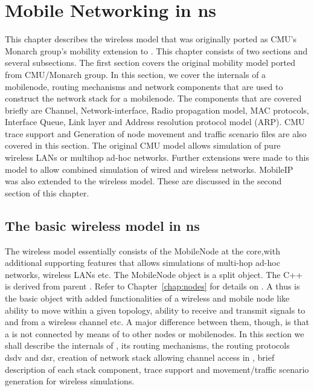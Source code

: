 %
\chapter{Mobile Networking in ns}
\label{chap:mobility}

This chapter describes the wireless model that was originally ported as CMU's Monarch group's mobility extension to \ns. 
This chapter consists of two sections and several subsections. The first section covers the original mobility model ported from CMU/Monarch group. In this section, we cover the internals of a mobilenode, routing mechanisms and network components that are used to construct the network stack for a mobilenode. The components that are covered briefly are Channel, Network-interface, Radio propagation model, MAC protocols, Interface Queue, Link layer and Address resolution protocol model (ARP). CMU trace support and Generation of node movement and traffic scenario files are also covered in this section.
The original CMU model allows simulation of pure wireless LANs or multihop ad-hoc networks. Further extensions were made to this model to allow combined simulation of wired and wireless networks. MobileIP was also extended to the wireless model. These are discussed in the second section of this chapter.		


\section{The basic wireless model in ns}
\label{sec:basic-model}

The wireless model essentially consists of the MobileNode at the core,with additional supporting features that allows simulations of multi-hop ad-hoc networks, wireless LANs etc. The MobileNode object is a split object. The C++  is derived from parent . Refer to Chapter~\ref{chap:nodes} for details on . A  thus is the basic  object with added functionalities of a wireless and mobile node like ability to move within a given topology, ability to receive and transmit signals to and from a wireless channel etc. A major difference between them, though, is that a  is not connected by means of  to other nodes or mobilenodes. In this section we shall describe the internals of , its routing mechanisms, the routing protocols dsdv and dsr, creation of network stack allowing channel access in , brief description of each stack component, trace support and movement/traffic scenario generation for wireless simulations.


